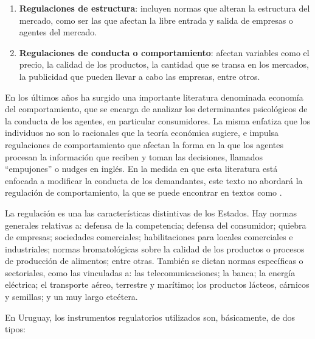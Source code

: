 \documentclass[
  12pt,
  spanish,
]{book}
\begin{document}
\begin{enumerate}
\def\labelenumi{\arabic{enumi}.}
\item
  \textbf{Regulaciones de estructura}: incluyen normas que alteran la estructura del mercado, como ser las que afectan la libre entrada y salida de empresas o agentes del mercado.
\item
  \textbf{Regulaciones de conducta o comportamiento}: afectan variables como el precio, la calidad de los productos, la cantidad que se transa en los mercados, la publicidad que pueden llevar a cabo las empresas, entre otros.
\end{enumerate}

En los últimos años ha surgido una importante literatura denominada economía del comportamiento, que se encarga de analizar los determinantes psicológicos de la conducta de los agentes, en particular consumidores. La misma enfatiza que los individuos no son lo racionales que la teoría económica sugiere, e impulsa regulaciones de comportamiento que afectan la forma en la que los agentes procesan la información que reciben y toman las decisiones, llamados ``empujones'' o nudges en inglés. En la medida en que esta literatura está enfocada a modificar la conducta de los demandantes, este texto no abordará la regulación de comportamiento, la que se puede encontrar en textos como \citep[ o \citet{Kanheman2015}]{Sunstein2009}.

La regulación es una las características distintivas de los Estados. Hay normas generales relativas a: defensa de la competencia; defensa del consumidor; quiebra de empresas; sociedades comerciales; habilitaciones para locales comerciales e industriales; normas bromatológicas sobre la calidad de los productos o procesos de producción de alimentos; entre otras. También se dictan normas específicas o sectoriales, como las vinculadas a: las telecomunicaciones; la banca; la energía eléctrica; el transporte aéreo, terrestre y marítimo; los productos lácteos, cárnicos y semillas; y un muy largo etcétera.

En Uruguay, los instrumentos regulatorios utilizados son, básicamente, de dos tipos:
\end{document}
